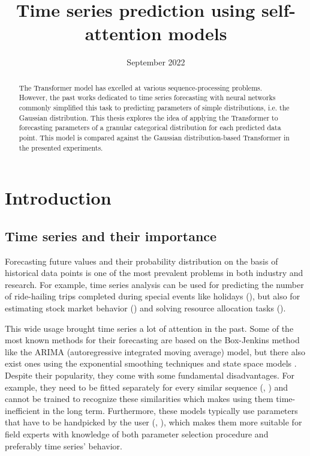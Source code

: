 \documentclass[en]{pracamgr}
\title{Time series prediction using self-attention models}
\date{September 2022}
\begin{document}
	\maketitle
	
	\begin{abstract}
		The Transformer model has excelled at various sequence-processing problems. However, the past works dedicated to time series forecasting with neural networks commonly simplified this task to predicting parameters of simple distributions, i.e. the Gaussian distribution. This thesis explores the idea of applying the Transformer to forecasting parameters of a granular categorical distribution for each predicted data point. This model is compared against the Gaussian distribution-based Transformer in the presented experiments.
		
	\end{abstract}
	
	\tableofcontents
	
	\chapter*{Introduction}
	
	\section*{Time series and their importance}\label{r:tsi}
	
	Forecasting future values and their probability distribution on the basis of historical data points is one of the most prevalent problems in both industry and research.
	For example, time series analysis can be used for predicting the number of ride-hailing trips completed during special events like holidays (\cite{uber}), but also for estimating stock market behavior (\cite{stock1}) and solving resource allocation tasks (\cite{graph-forecast}). 
	
	
	This wide usage brought time series a lot of attention in the past. Some of the most known methods for their forecasting are based on the Box-Jenkins method like the ARIMA (autoregressive integrated moving average) \cite{arima} model, but there also exist ones using the exponential smoothing techniques and state space models \cite{ssm}. Despite their popularity, they come with some fundamental disadvantages. For example, they need to be fitted separately for every similar sequence (\cite{enhancing}, \cite{deepar}) and cannot be trained to recognize these similarities which makes using them time-inefficient in the long term.
	Furthermore, these models typically use parameters that have to be handpicked by the user (\cite{enhancing},
	\cite{deepar}), which makes them more suitable for field experts with knowledge of both parameter selection procedure and preferably time series' behavior.
	
\end{document}
